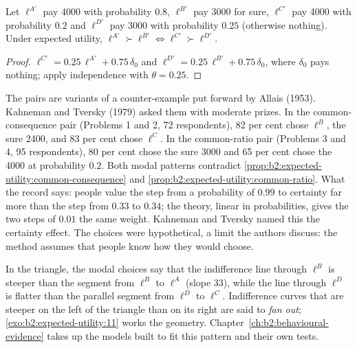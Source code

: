 \begin{proposition}\label{prop:b2:expected-utility:common-ratio}
Let $\ell^{A'}$ pay \num{4000} with probability $0.8$, $\ell^{B'}$ pay \num{3000} for sure,
$\ell^{C'}$ pay \num{4000} with probability $0.2$ and $\ell^{D'}$ pay \num{3000} with probability
$0.25$ (otherwise nothing). Under expected utility, $\ell^{A'} \succ \ell^{B'} \iff \ell^{C'} \succ
\ell^{D'}$.
\end{proposition}

\begin{proof}
$\ell^{C'} = 0.25\,\ell^{A'} + 0.75\,\delta_0$ and $\ell^{D'} = 0.25\,\ell^{B'} + 0.75\,\delta_0$, where
$\delta_0$ pays nothing; apply independence with $\theta = 0.25$.
\end{proof}

\begin{record}
The pairs are variants of a counter-example put forward by Allais (1953). Kahneman and Tversky (1979)
asked them with moderate prizes. In the common-consequence pair (Problems 1 and 2, 72 respondents),
82 per cent chose $\ell^{B}$, the sure \num{2400}, and 83 per cent chose $\ell^{C}$.
In the common-ratio pair (Problems 3 and 4, 95 respondents), 80 per cent chose the sure \num{3000} and
65 per cent chose the \num{4000} at probability $0.2$.
Both modal patterns contradict \cref{prop:b2:expected-utility:common-consequence} and
\cref{prop:b2:expected-utility:common-ratio}. What the record says: people value the step from a
probability of $0.99$ to certainty far more than the step from $0.33$ to $0.34$; the theory, linear in
probabilities, gives the two steps of $0.01$ the same weight. Kahneman and Tversky named this the
certainty effect. The choices were hypothetical, a limit the authors discuss: the method assumes that people know how
they would choose.
\end{record}

In the triangle, the modal choices say that the indifference line through $\ell^{B}$ is steeper than
the segment from $\ell^{B}$ to $\ell^{A}$ (slope $33$), while the line through $\ell^{D}$ is flatter
than the parallel segment from $\ell^{D}$ to $\ell^{C}$. Indifference curves that are steeper on the
left of the triangle than on its right are said to \emph{fan out}; \cref{exo:b2:expected-utility:11}
works the geometry. Chapter~\ref{ch:b2:behavioural-evidence} takes up the models built to fit this
pattern and their own tests.

